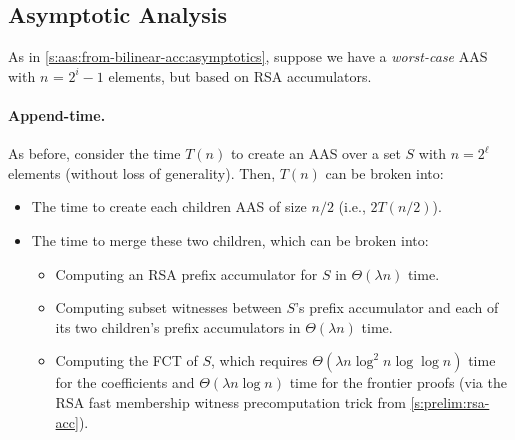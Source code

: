 
\subsection{Asymptotic Analysis}
\label{s:aas:from-rsa-acc:asymptotics}
As in \cref{s:aas:from-bilinear-acc:asymptotics}, suppose we have a \textit{worst-case} AAS with $n$ = $2^i - 1$ elements, but based on RSA accumulators.

\paragraph{Append-time.}
As before, consider the time $T(n)$ to create an AAS over a set $S$ with $n = 2^\ell$ elements (without loss of generality).
Then, $T(n)$ can be broken into:
\begin{itemize}
    \item The time to create each children AAS of size $n/2$ (i.e., $2T(n/2)$).
    \item The time to merge these two children, which can be broken into:
    \begin{itemize}
        \item Computing an RSA prefix accumulator for $S$ in $\Theta(\lambda n)$ time.
        \item Computing subset witnesses between $S$'s prefix accumulator and each of its two children's prefix accumulators in $\Theta(\lambda n)$ time.
        \item Computing the FCT of $S$, which requires $\Theta(\lambda n\log^2{n}\log\log{n})$ time for the \bezout coefficients and $\Theta(\lambda n \log{n})$ time for the frontier proofs (via the RSA fast membership witness precomputation trick from \cref{s:prelim:rsa-acc}).
    \end{itemize}
\end{itemize}


